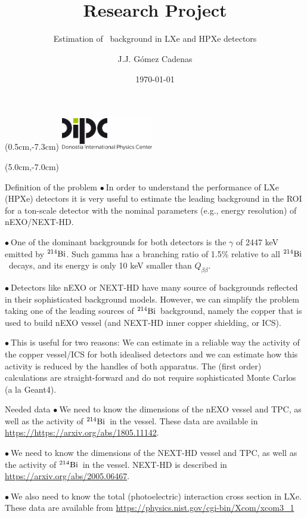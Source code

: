 \documentclass [aspectratio=169]{beamer}
\title[]{\vspace{60pt} \\
Research Project} %
\subtitle{Estimation of \BI\ background in LXe and HPXe detectors}
\author[]{J.J. Gómez Cadenas}
\institute[]{Donostia International Physics Center}
\date{\today}
\newcommand{\qbb}{\ensuremath{Q_{\beta\beta}}}
\newcommand{\BI}{\ensuremath{{}^{214}{\rm Bi}}}
\begin{document}
{
\begin{frame}
    \titlepage
    \begin{textblock*}{4cm}(0.5cm,-7.3cm)
        \includegraphics[width=4cm]{dipc.png}
    \end{textblock*}
    \begin{textblock*}{8cm}(5.0cm,-7.0cm)
        \huge \color{uwopurple}{$\Bigr\rvert$ \hspace{0.15cm} \textbf{}} %
    \end{textblock*}
\end{frame}
}

\begin{frame}{Definition of the problem}
$\bullet~$In order to understand the performance of LXe (HPXe) detectors it is very useful to estimate the leading background in the ROI for a ton-scale detector with the nominal parameters (e.g., energy resolution) of nEXO/NEXT-HD.
 
$\bullet~$One of the dominant backgrounds for both detectors is the $\gamma$ of 2447 keV emitted by \BI. Such gamma has a branching ratio of 1.5\% relative to all \BI\ decays, and its energy is only 10 keV smaller than \qbb.

$\bullet~$Detectors like nEXO or NEXT-HD have many source of backgrounds reflected in their sophisticated background models. However, we can simplify the problem taking one of the leading sources of \BI\ background, namely the copper that is used to build nEXO vessel (and NEXT-HD inner copper shielding, or ICS). 

$\bullet~$This is useful for two reasons: We can estimate in a reliable way the activity of the copper vessel/ICS for both idealised detectors and we can estimate how this activity is reduced by the handles of both apparatus. The (first order) calculations are straight-forward and do not require sophisticated Monte Carlos (a la Geant4).  
\end{frame}

\begin{frame}{Needed data}
$\bullet~$We need to know the dimensions of the nEXO vessel and TPC, as well as the activity of \BI\ in the vessel. These data are available in \url{https://https://arxiv.org/abs/1805.11142}.

$\bullet~$We need to know the dimensions of the NEXT-HD vessel and TPC, as well as the activity of \BI\ in the vessel. NEXT-HD is described in \url{https://arxiv.org/abs/2005.06467}. 

$\bullet~$We also need to know the total (photoelectric) interaction cross section in LXe. These data are available from \url{https://physics.nist.gov/cgi-bin/Xcom/xcom3_1}
\end{frame}
\end{document}
